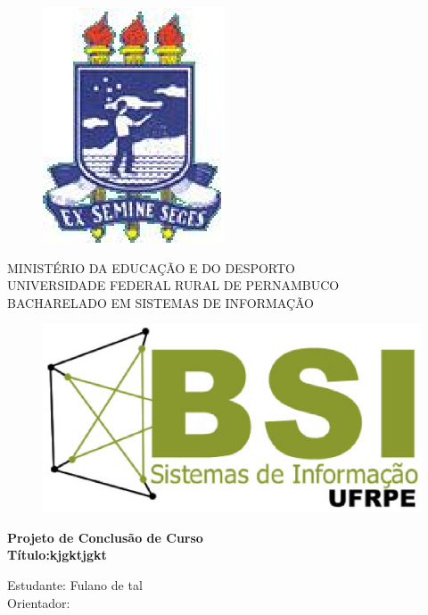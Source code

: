 \documentclass[a4paper,11pt]{article}
\begin{document}
\pagestyle {empty}


\vspace*{-2cm}
\begin{figure}[h]
\leavevmode
\begin{minipage}[t]{\textwidth}
\includegraphics[scale=0.7]{images/logo-ufrpe.eps}
\end{minipage}
\end{figure}

\vspace*{-3.0cm}
{\bf
\begin{center}
{
\hspace*{0cm} 	MINISTÉRIO DA EDUCAÇÃO E DO DESPORTO \\
\hspace*{.2in} UNIVERSIDADE FEDERAL RURAL DE PERNAMBUCO \\
\hspace*{.2in} BACHARELADO EM SISTEMAS DE INFORMAÇÃO} \\
\end{center}}
\vspace{0.0cm}
\noindent
\begin{figure}[h]
\centering
\includegraphics[scale=0.5]{images/Logo-bsi-presencial-v3-amp.eps}
\end{figure}
\vspace*{2.0cm}
\begin{center}


{\Large \bf  Projeto de Conclusão de Curso}\\[1cm]
{\Large \bf Título:kjgktjgkt} \\[3cm]
\end{center}
{\Large  Estudante: Fulano de tal}\\[6mm]
{\Large  Orientador: }\\[6mm]
\end{document}
